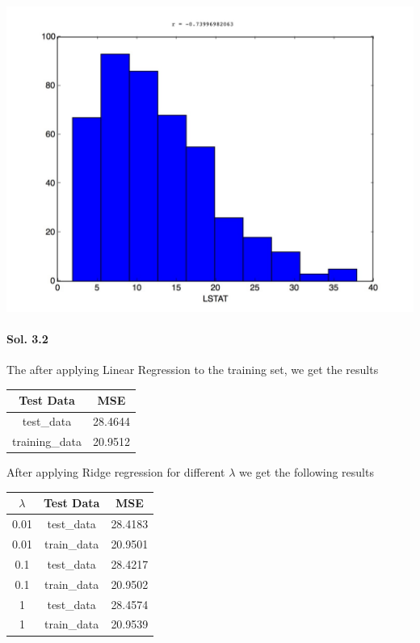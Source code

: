 \documentclass[]{report}
\begin{document}
\begin{center}
			\includegraphics[scale=0.2]{hist_12}\\
		\end{center}

	\paragraph{Sol. 3.2}
		The after applying Linear Regression to the training set, we get the results

		\begin{center}
			\begin{tabular}{c|c}
				Test Data & MSE \\
				\hline
				test\_data & 28.4644 \\
				training\_data &20.9512 \\
				\hline
			\end{tabular}
		\end{center}

	
		After applying Ridge regression for different $\lambda$ we get the following results
		\begin{center}
		\begin{tabular}{c|c|c}
			\hline
			   	 $\lambda$ & Test Data    &     MSE \\
			\hline
			     0.01 & test\_data  & 28.4183 \\
			     0.01 & train\_data & 20.9501 \\
			     0.1  & test\_data  & 28.4217 \\
			     0.1  & train\_data & 20.9502 \\
			     1    & test\_data  & 28.4574 \\
			     1    & train\_data & 20.9539 \\
			\hline
		\end{tabular}
		\end{center}
\end{document}
